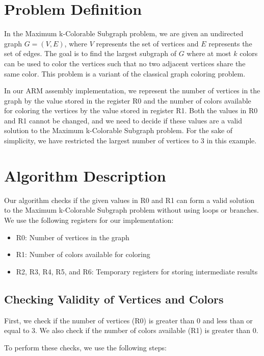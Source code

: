 \section{Problem Definition}

In the Maximum k-Colorable Subgraph problem, we are given an undirected graph $G = (V, E)$, where $V$ represents the set of vertices and $E$ represents the set of edges. The goal is to find the largest subgraph of $G$ where at most $k$ colors can be used to color the vertices such that no two adjacent vertices share the same color. This problem is a variant of the classical graph coloring problem.

In our ARM assembly implementation, we represent the number of vertices in the graph by the value stored in the register R0 and the number of colors available for coloring the vertices by the value stored in register R1. Both the values in R0 and R1 cannot be changed, and we need to decide if these values are a valid solution to the Maximum k-Colorable Subgraph problem. For the sake of simplicity, we have restricted the largest number of vertices to 3 in this example.

\section{Algorithm Description}

Our algorithm checks if the given values in R0 and R1 can form a valid solution to the Maximum k-Colorable Subgraph problem without using loops or branches. We use the following registers for our implementation:

\begin{itemize}
    \item R0: Number of vertices in the graph
    \item R1: Number of colors available for coloring
    \item R2, R3, R4, R5, and R6: Temporary registers for storing intermediate results
\end{itemize}

\subsection{Checking Validity of Vertices and Colors}

First, we check if the number of vertices (R0) is greater than 0 and less than or equal to 3. We also check if the number of colors available (R1) is greater than 0.

To perform these checks, we use the following steps:

